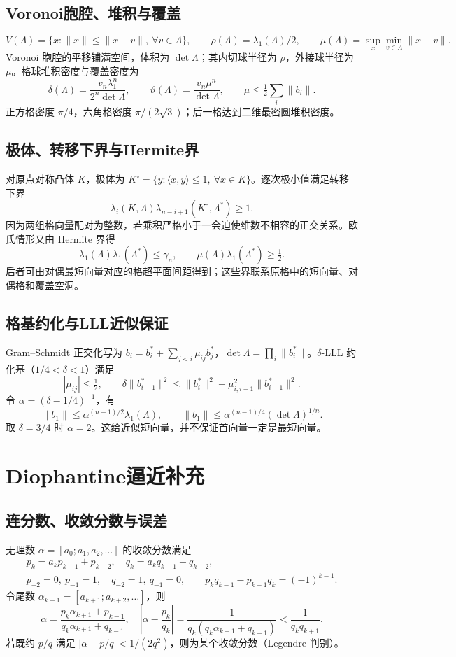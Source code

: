\documentclass[../main.tex]{subfiles}
\begin{document}
\subsection{Voronoi胞腔、堆积与覆盖}
\[
V(\Lambda)=\{x:\|x\|\le\|x-v\|,\ \forall v\in\Lambda\},\qquad
\rho(\Lambda)=\lambda_1(\Lambda)/2,\qquad
\mu(\Lambda)=\sup_x\min_{v\in\Lambda}\|x-v\|.
\]
Voronoi 胞腔的平移铺满空间，体积为 $\det\Lambda$；其内切球半径为 $\rho$，外接球半径为 $\mu$。格球堆积密度与覆盖密度为
\[
\delta(\Lambda)=\frac{v_n\lambda_1^n}{2^n\det\Lambda},\qquad
\vartheta(\Lambda)=\frac{v_n\mu^n}{\det\Lambda},\qquad
\mu\le\tfrac12\sum_i\|b_i\|.
\]
正方格密度 $\pi/4$，六角格密度 $\pi/(2\sqrt3)$；后一格达到二维最密圆堆积密度。
\subsection{极体、转移下界与Hermite界}
对原点对称凸体 $K$，极体为 $K^\circ=\{y:\langle x,y\rangle\le1,\ \forall x\in K\}$。逐次极小值满足转移下界
\[
\lambda_i(K,\Lambda)\lambda_{n-i+1}(K^\circ,\Lambda^*)\ge1.
\]
因为两组格向量配对为整数，若乘积严格小于一会迫使维数不相容的正交关系。欧氏情形又由 Hermite 界得
\[
\lambda_1(\Lambda)\lambda_1(\Lambda^*)\le\gamma_n,\qquad
\mu(\Lambda)\lambda_1(\Lambda^*)\ge\tfrac12.
\]
后者可由对偶最短向量对应的格超平面间距得到；这些界联系原格中的短向量、对偶格和覆盖空洞。
\subsection{格基约化与LLL近似保证}
Gram--Schmidt 正交化写为 $b_i=b_i^*+\sum_{j<i}\mu_{ij}b_j^*$，$\det\Lambda=\prod_i\|b_i^*\|$。$\delta$-LLL 约化基（$1/4<\delta<1$）满足
\[
|\mu_{ij}|\le\tfrac12,\qquad
\delta\|b_{i-1}^*\|^2\le\|b_i^*\|^2+\mu_{i,i-1}^2\|b_{i-1}^*\|^2.
\]
令 $\alpha=(\delta-1/4)^{-1}$，有
\[
\|b_1\|\le\alpha^{(n-1)/2}\lambda_1(\Lambda),\qquad
\|b_1\|\le\alpha^{(n-1)/4}(\det\Lambda)^{1/n}.
\]
取 $\delta=3/4$ 时 $\alpha=2$。这给近似短向量，并不保证首向量一定是最短向量。
\section{Diophantine逼近补充}
\subsection{连分数、收敛分数与误差}
无理数 $\alpha=[a_0;a_1,a_2,\ldots]$ 的收敛分数满足
\begin{gather*}
p_k=a_kp_{k-1}+p_{k-2},\quad q_k=a_kq_{k-1}+q_{k-2},\\
p_{-2}=0,\ p_{-1}=1,\quad q_{-2}=1,\ q_{-1}=0,\qquad
p_kq_{k-1}-p_{k-1}q_k=(-1)^{k-1}.
\end{gather*}
令尾数 $\alpha_{k+1}=[a_{k+1};a_{k+2},\ldots]$，则
\[
\alpha=\frac{p_k\alpha_{k+1}+p_{k-1}}{q_k\alpha_{k+1}+q_{k-1}},\quad
\left|\alpha-\frac{p_k}{q_k}\right|=\frac1{q_k(q_k\alpha_{k+1}+q_{k-1})}
<\frac1{q_kq_{k+1}}.
\]
若既约 $p/q$ 满足 $|\alpha-p/q|<1/(2q^2)$，则为某个收敛分数（Legendre 判别）。
\end{document}
